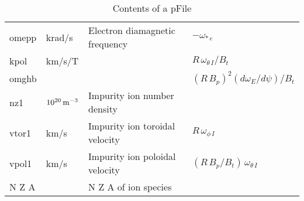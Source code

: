 \documentclass[notitlepage,12pt]{article}
\begin{document}
\begin{table}
\begin{tabular}{llll}
{\sf omepp} &krad/s&Electron diamagnetic frequency&$-\omega_{\ast\,e}$\\
{\sf kpol} &km/s/T&&$R\,\omega_{\theta\,I}/B_t$\\
{\sf omghb} &&&$(R\,B_p)^2(d\omega_E/d\psi)/B_t$\\
{\sf nz1} & $10^{20}\,{\rm m}^{-3}$& Impurity ion number density&\\
{\sf vtor1} & km/s& Impurity ion toroidal velocity&$R\,\omega_{\phi\,I}$\\
{\sf vpol1} & km/s& Impurity ion poloidal velocity&$(R\,B_p/B_t)\,\omega_{\theta\, I}$\\
{\sf N Z A}&& N Z A of ion species&\\\hline
\end{tabular}
\caption{Contents of a pFile}
\end{table}
\end{document}
